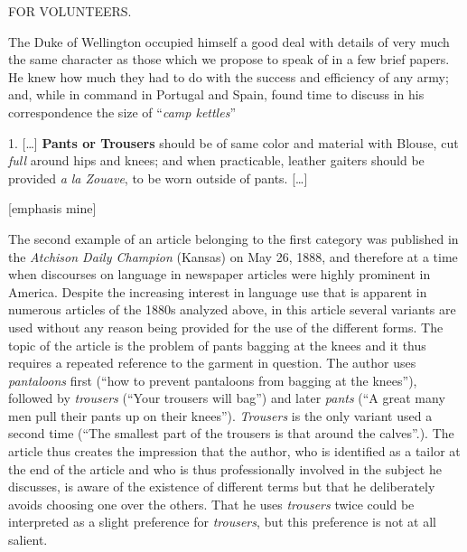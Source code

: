 \begin{ipquote}
\begin{center}
FOR VOLUNTEERS.    
\end{center}
The Duke of Wellington occupied himself a good deal with details of very much the same character as those which we propose to speak of in a few brief papers. He knew how much they had to do with the success and efficiency of any army; and, while in command in Portugal and Spain, found time to discuss in his correspondence the size of “\textit{camp kettles}”

{1. […] \textbf{Pants or Trousers} should be of same color and material with Blouse, cut \textit{full} around hips and knees; and when practicable, leather gaiters should be provided \textit{a la Zouave}, to be worn outside of pants. […]

\raggedleft
{[emphasis mine]}\\
}
\end{ipquote}

The second example of an article belonging to the first category was published in the \emph{Atchison Daily Champion} (Kansas) on May 26, 1888, and therefore at a time when discourses on language in newspaper articles were highly prominent in America. Despite the increasing interest in language use that is apparent in numerous articles of the 1880s analyzed above, in this article several variants are used without any reason being provided for the use of the different forms. The topic of the article is the problem of pants bagging at the knees and it thus requires a repeated reference to the garment in question. The author uses \emph{pantaloons} first (“how to prevent pantaloons from bagging at the knees”), followed by \emph{trousers} (“Your trousers will bag”) and later \emph{pants} (“A great many men pull their pants up on their knees”). \emph{Trousers} is the only variant used a second time (“The smallest part of the trousers is that around the calves”.). The article thus creates the impression that the author, who is identified as a tailor at the end of the article and who is thus professionally involved in the subject he discusses, is aware of the existence of different terms but that he deliberately avoids choosing one over the others. That he uses \emph{trousers} twice could be interpreted as a slight preference for \emph{trousers}, but this preference is not at all salient.

